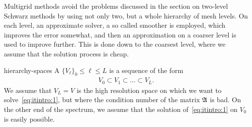 
\begin{intro}
   Multigrid methods avoid the problems discussed
  in the section on two-level Schwarz methods by using not only two,
  but a whole hierarchy of mesh levels. On each level, an approximate
  solver, a so called smoother is employed, which improves the error
  somewhat, and then an approximation on a coarser level is used to
  improve further. This is done down to the coarsest level, where we
  assume that the solution process is cheap.
\end{intro}

\begin{Definition}{hierarchy-spaces}
  A  $\{V_\ell\}_0\le \ell \le L$ is a
  sequence of the form
  \begin{gather}
    V_0 \subset V_1 \subset \dots \subset V_L.
  \end{gather}
  We assume that $V_L = V$ is the high resolution space on which we
  want to solve~\eqref{eq:itintro:1}, but where the condition number
  of the matrix $\mathfrak{A}$ is bad. On the other end of the spectrum, we
  assume that the solution of~\eqref{eq:itintro:1} on $V_0$ is easily
  possible.
\end{Definition}

